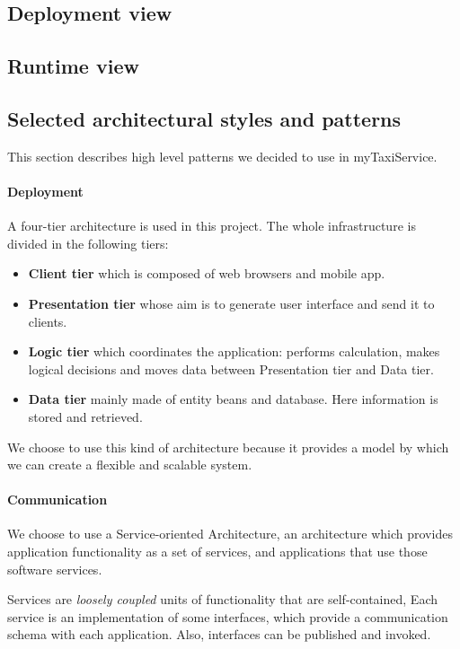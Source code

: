 \subsection{Deployment view}
\label{sec:deploy}

\subsection{Runtime view}

\subsection{Selected architectural styles and patterns}
This section describes high level patterns we decided to use in myTaxiService.

\paragraph{Deployment} A four-tier architecture is used in this project.
The whole infrastructure is divided in the following tiers:

\begin{itemize}
    \item{\textbf{Client tier} which is composed of web browsers and mobile app.}
    \item{\textbf{Presentation tier} whose aim is to generate user interface and send it to clients.}
    \item{\textbf{Logic tier} which coordinates the application: performs calculation, makes logical decisions and moves data between Presentation tier and Data tier.}
    \item{\textbf{Data tier} mainly made of entity beans and database. 
    Here information is stored and retrieved.}
\end{itemize}

We choose to use this kind of architecture because it provides a model by which
we can create a flexible and scalable system.

\paragraph{Communication} We choose to use a Service-oriented Architecture, 
an architecture which provides application functionality as a set of services, 
and applications that use those software services. 

Services are \textit{loosely coupled} units of functionality that are self-contained, 
Each service is an implementation of some interfaces, which provide a communication schema with
each application. Also, interfaces can be published and invoked.

